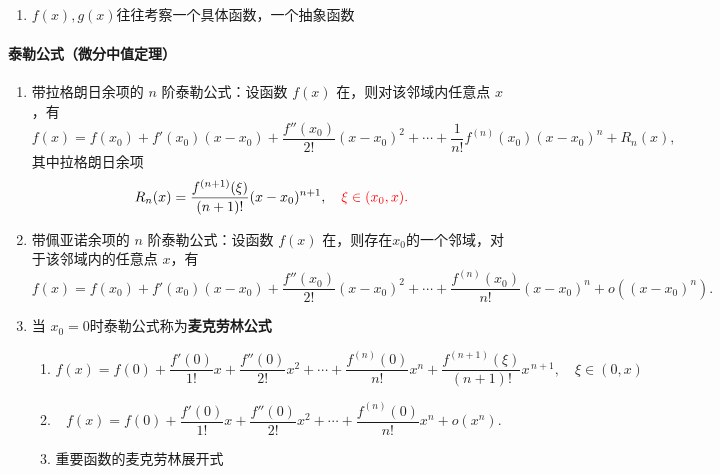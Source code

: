 \documentclass[../book.tex]{subfiles}
\begin{document}
    \begin{enumerate}
        \item $f(x), g(x)$往往考察一个具体函数，一个抽象函数
    \end{enumerate}

    \paragraph{泰勒公式（微分中值定理）}

    \begin{enumerate}
        \item 带拉格朗日余项的 $n$ 阶泰勒公式：设函数 $f(x)$ 在{}，则对该邻域内任意点 $x$，有
        \[
            f(x)
            = f(x_0) + f'(x_0)(x-x_0)
            + \frac{f''(x_0)}{2!}(x-x_0)^2
            + \cdots
            + \frac{1}{n!}f^{(n)}(x_0)(x-x_0)^n
            + R_n(x),
        \]
        其中拉格朗日余项
        \[
            R_n(x)
            = \frac{f^{(n+1)}(\xi)}{(n+1)!}(x-x_0)^{n+1},
            \quad \color{red}{\xi \in (x_0, x)}.
        \]

        \item 带佩亚诺余项的 $n$ 阶泰勒公式：设函数 $f(x)$ 在{}，则存在$x_0$的一个邻域，对于该邻域内的任意点 $x$，有
        \[
            f(x)
            = f(x_0) + f'(x_0)(x-x_0)
            + \frac{f''(x_0)}{2!}(x-x_0)^2
            + \cdots
            + \frac{f^{(n)}(x_0)}{n!}(x-x_0)^n
            + o\!\left((x-x_0)^n\right).
        \]
        \item 当 $x_0 = 0$时泰勒公式称为\textbf{麦克劳林公式}
        \begin{enumerate}
            \item \[
                      f(x)
                      = f(0)
                      + \frac{f'(0)}{1!}x
                      + \frac{f''(0)}{2!}x^2
                      + \cdots
                      + \frac{f^{(n)}(0)}{n!}x^n
                      + \frac{f^{(n+1)}(\xi)}{(n+1)!}x^{\,n+1}, \quad \xi \in (0, x)
            \]
            \item \[
                      f(x)
                      = f(0)
                      + \frac{f'(0)}{1!}x
                      + \frac{f''(0)}{2!}x^2
                      + \cdots
                      + \frac{f^{(n)}(0)}{n!}x^n
                      + o(x^n).
            \]
            \item 重要函数的麦克劳林展开式
\end{enumerate}
\end{enumerate}
\end{document}
